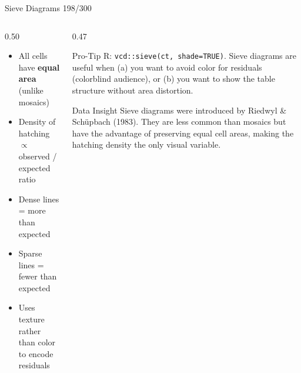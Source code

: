 \documentclass[10pt]{beamer}
\newcommand{\smark}[1]{\hfill{\scriptsize\color{codegray}#1}}
\begin{document}
\begin{frame}{Sieve Diagrams}
\smark{198/300}
\begin{columns}[T]
\begin{column}{0.50\textwidth}
\begin{itemize}
    \item All cells have \textbf{equal area} (unlike mosaics)
    \item Density of hatching $\propto$ observed / expected ratio
    \item Dense lines = more than expected
    \item Sparse lines = fewer than expected
    \item Uses texture rather than color to encode residuals
\end{itemize}
\end{column}
\begin{column}{0.47\textwidth}
\begin{alertblock}{Pro-Tip}
    \scriptsize R: \texttt{vcd::sieve(ct, shade=TRUE)}. Sieve diagrams are useful when (a) you want to avoid color for residuals (colorblind audience), or (b) you want to show the table structure without area distortion.
\end{alertblock}
\vspace{0.1cm}
\begin{exampleblock}{Data Insight}
    \scriptsize Sieve diagrams were introduced by Riedwyl \& Sch\"upbach (1983). They are less common than mosaics but have the advantage of preserving equal cell areas, making the hatching density the only visual variable.
\end{exampleblock}
\end{column}
\end{columns}
\end{frame}
\end{document}
